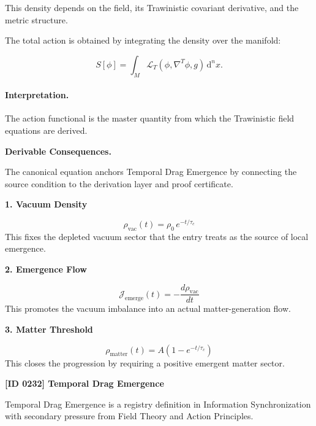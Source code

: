 This density depends on the field, its Trawinistic covariant derivative, and the metric structure.

The total action is obtained by integrating the density over the manifold:

\begin{equation}
\boxed{
S[\phi]
=
\int_M
\mathcal{L}_T
\left(
\phi,\nabla^T\phi,g
\right)
\,\mathrm{d}^n x .
}
\end{equation}

\paragraph{Interpretation.}
The action functional is the master quantity from which the Trawinistic field equations are derived.

\par\vspace{0.35em}
\noindent\textbf{Derivable Consequences.}\quad
\begingroup
\footnotesize
\raggedright
The canonical equation anchors Temporal Drag Emergence by connecting the source condition to the derivation layer and proof certificate.
\par\endgroup

\noindent\textbf{1. Vacuum Density}\par
\[
\rho_{\mathrm{vac}}(t)=\rho_0\,e^{-t/\tau_c}
\]
\noindent This fixes the depleted vacuum sector that the entry treats as the source of local emergence.\par
\noindent\textbf{2. Emergence Flow}\par
\[
\mathcal{J}_{\mathrm{emerge}}(t)=-\frac{d\rho_{\mathrm{vac}}}{dt}
\]
\noindent This promotes the vacuum imbalance into an actual matter-generation flow.\par
\noindent\textbf{3. Matter Threshold}\par
\[
\rho_{\mathrm{matter}}(t)=A\left(1-e^{-t/\tau_c}\right)
\]
\noindent This closes the progression by requiring a positive emergent matter sector.\par

\clearpage
\noindent\textbf{[ID 0232] Temporal Drag Emergence}\par
\vspace{0.35em}
\begingroup\small
{}
Temporal Drag Emergence is a registry definition in Information Synchronization with secondary pressure from Field Theory and Action Principles.


